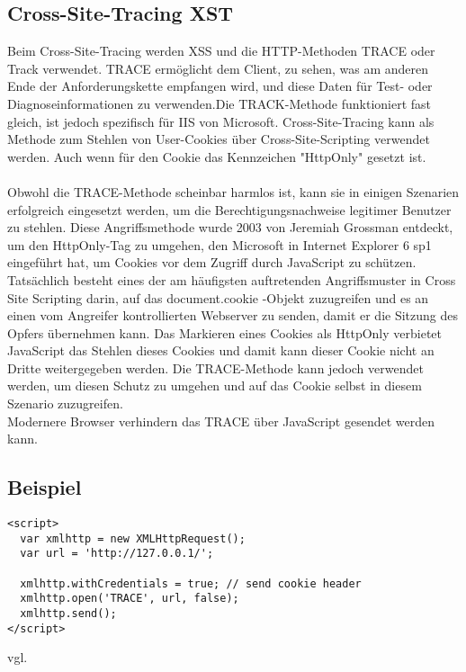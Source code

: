 {\subsection{Cross-Site-Tracing XST}
\label{sec:CSTXST}
Beim Cross-Site-Tracing werden XSS und die HTTP-Methoden TRACE oder Track verwendet. TRACE ermöglicht dem Client, zu sehen, was am anderen Ende der Anforderungskette empfangen wird, und diese Daten für Test- oder Diagnoseinformationen zu verwenden.Die TRACK-Methode funktioniert fast gleich, ist jedoch spezifisch für IIS von Microsoft. Cross-Site-Tracing kann als Methode zum Stehlen von User-Cookies über Cross-Site-Scripting verwendet werden. Auch wenn für den Cookie das Kennzeichen "HttpOnly" gesetzt ist.
\\ \\
Obwohl die TRACE-Methode scheinbar harmlos ist, kann sie in einigen Szenarien erfolgreich eingesetzt werden, um die Berechtigungsnachweise legitimer Benutzer zu stehlen. Diese Angriffsmethode wurde 2003 von Jeremiah Grossman entdeckt, um den HttpOnly-Tag zu umgehen, den Microsoft in Internet Explorer 6 sp1 eingeführt hat, um Cookies vor dem Zugriff durch JavaScript zu schützen. Tatsächlich besteht eines der am häufigsten auftretenden Angriffsmuster in Cross Site Scripting darin, auf das document.cookie -Objekt zuzugreifen und es an einen vom Angreifer kontrollierten Webserver zu senden, damit er die Sitzung des Opfers übernehmen kann. Das Markieren eines Cookies als HttpOnly verbietet JavaScript das Stehlen dieses Cookies und damit kann dieser Cookie nicht an Dritte weitergegeben werden. Die TRACE-Methode kann jedoch verwendet werden, um diesen Schutz zu umgehen und auf das Cookie selbst in diesem Szenario zuzugreifen.
\\
Modernere Browser verhindern das TRACE über JavaScript gesendet werden kann.
\pagebreak
\subsection{Beispiel}
\label{sec:cst_bsp}
\begin{lstlisting}
<script>
  var xmlhttp = new XMLHttpRequest();
  var url = 'http://127.0.0.1/';

  xmlhttp.withCredentials = true; // send cookie header
  xmlhttp.open('TRACE', url, false);
  xmlhttp.send();
</script>
\end{lstlisting}
vgl. \textcite{XST}
}
